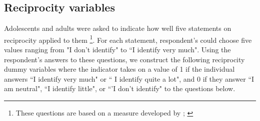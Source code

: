 \subsection{Reciprocity variables}
Adolescents and adults were asked to indicate how well five statements on reciprocity applied to them \footnote{These questions are based on a measure developed by \cite{Perugini-etal_2003_EJP}; \cite{Dohmen_Falk_etal_2009_EJ}}. For each statement, respondent's could choose five values ranging from  "I don't identify" to ``I identify very much". Using the respondent's answers to these questions, we construct the following reciprocity dummy variables where the indicator takes on a value of 1 if the individual answers ``I identify very much" or `` I identify quite a lot", and 0 if they answer ``I am neutral", ``I identify little", or ``'I don't identify" to the questions below.
\begin{table}[H]
\begin{center}
\end{center}
\end{table}

